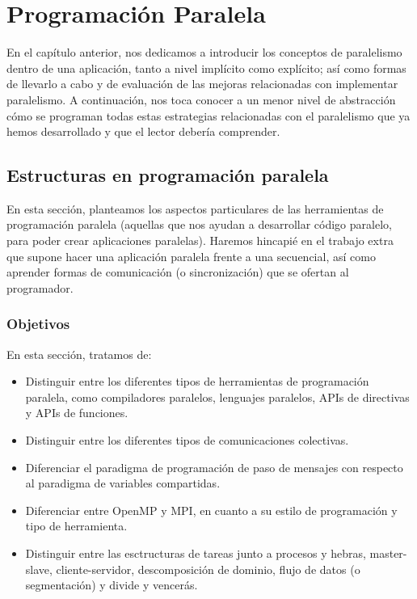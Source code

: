 \chapter{Programación Paralela}

En el capítulo anterior, nos dedicamos a introducir los conceptos de paralelismo dentro de una aplicación, tanto a nivel implícito como explícito; así como formas de llevarlo a cabo y de evaluación de las mejoras relacionadas con implementar paralelismo. A continuación, nos toca conocer a un menor nivel de abstracción cómo se programan todas estas estrategias relacionadas con el paralelismo que ya hemos desarrollado y que el lector debería comprender.

\section{Estructuras en programación paralela}
En esta sección, planteamos los aspectos particulares de las herramientas de programación paralela (aquellas que nos ayudan a desarrollar código paralelo, para poder crear aplicaciones paralelas). Haremos hincapié en el trabajo extra que supone hacer una aplicación paralela frente a una secuencial, así como aprender formas de comunicación (o sincronización) que se ofertan al programador.

\subsection{Objetivos}
En esta sección, tratamos de:
\begin{itemize}
    \item Distinguir entre los diferentes tipos de herramientas de programación paralela, como compiladores paralelos, lenguajes paralelos, APIs de directivas y APIs de funciones.
    \item Distinguir entre los diferentes tipos de comunicaciones colectivas.
    \item Diferenciar el paradigma de programación de paso de mensajes con respecto al paradigma de variables compartidas.
    \item Diferenciar entre OpenMP y MPI, en cuanto a su estilo de programación y tipo de herramienta.
    \item Distinguir entre las esctructuras de tareas junto a procesos y hebras, master-slave, cliente-servidor, descomposición de dominio, flujo de datos (o segmentación) y divide y vencerás.
\end{itemize}

